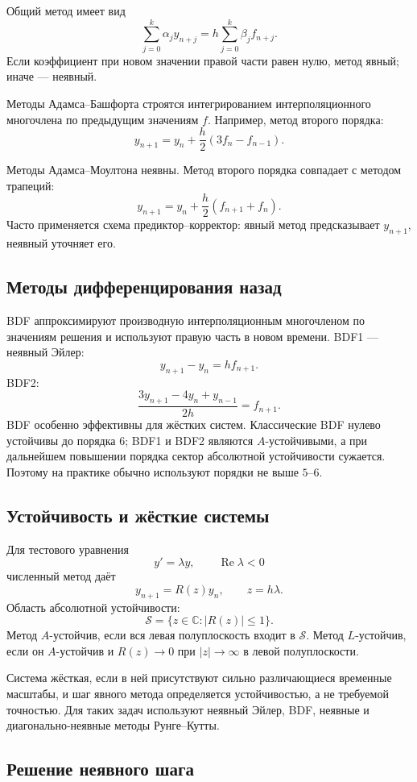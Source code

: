 Общий метод имеет вид
\[
    \sum_{j=0}^{k}\alpha_j y_{n+j}
    =h\sum_{j=0}^{k}\beta_j f_{n+j}.
\]
Если коэффициент при новом значении правой части равен нулю, метод явный;
иначе --- неявный.

Методы Адамса--Башфорта строятся интегрированием интерполяционного многочлена по
предыдущим значениям $f$. Например, метод второго порядка:
\[
    y_{n+1}=y_n+\frac h2(3f_n-f_{n-1}).
\]

Методы Адамса--Моултона неявны. Метод второго порядка совпадает с методом
трапеций:
\[
    y_{n+1}=y_n+\frac h2(f_{n+1}+f_n).
\]
Часто применяется схема предиктор--корректор: явный метод предсказывает
$y_{n+1}$, неявный уточняет его.

\subsection{Методы дифференцирования назад}

BDF аппроксимируют производную интерполяционным многочленом по значениям решения
и используют правую часть в новом времени. BDF1 --- неявный Эйлер:
\[
    y_{n+1}-y_n=hf_{n+1}.
\]
BDF2:
\[
    \frac{3y_{n+1}-4y_n+y_{n-1}}{2h}=f_{n+1}.
\]
BDF особенно эффективны для жёстких систем. Классические BDF нулево устойчивы
до порядка $6$; BDF1 и BDF2 являются $A$-устойчивыми, а при дальнейшем повышении
порядка сектор абсолютной устойчивости сужается. Поэтому на практике обычно
используют порядки не выше $5$--$6$.

\subsection{Устойчивость и жёсткие системы}

Для тестового уравнения
\[
    y'=\lambda y,
    \qquad \operatorname{Re}\lambda<0
\]
численный метод даёт
\[
    y_{n+1}=R(z)y_n,
    \qquad z=h\lambda.
\]
Область абсолютной устойчивости:
\[
    \mathcal S=\{z\in\mathbb C:|R(z)|\leq1\}.
\]
Метод $A$-устойчив, если вся левая полуплоскость входит в $\mathcal S$.
Метод $L$-устойчив, если он $A$-устойчив и $R(z)\to0$ при $|z|\to\infty$ в левой
полуплоскости.

Система жёсткая, если в ней присутствуют сильно различающиеся временные масштабы,
и шаг явного метода определяется устойчивостью, а не требуемой точностью.
Для таких задач используют неявный Эйлер, BDF, неявные и диагонально-неявные
методы Рунге--Кутты.

\subsection{Решение неявного шага}

